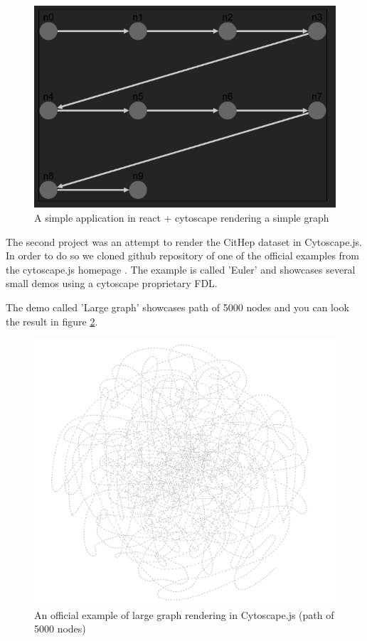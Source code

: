 \begin{figure}[p]\centering
  \includegraphics[width=140mm, keepaspectratio]{img/cytoscape_react_10_nodes_path.png}
  \caption{A simple application in react + cytoscape rendering a simple graph}
  \label{obr:cytoscape_react_test}
\end{figure}

The second project was an attempt to render the CitHep dataset in Cytoscape.js.
In order to do so we cloned github repository of one of the official examples from the cytoscape.js homepage \cite{cytoscapes_js_github}.
The example is called 'Euler' and showcases several small demos using a cytoscape proprietary \gls{FDL}.

The demo called 'Large graph' showcases path of 5000 nodes and you can look the result in figure \ref{obr:cytoscape_5000_nodes_path}.

\begin{figure}[p]\centering
  \includegraphics[width=140mm, keepaspectratio]{img/cytoscape_5000_path_official_demo.png}
  \caption{An official example of large graph rendering in Cytoscape.js (path of 5000 nodes)}
  \label{obr:cytoscape_5000_nodes_path}
\end{figure}

